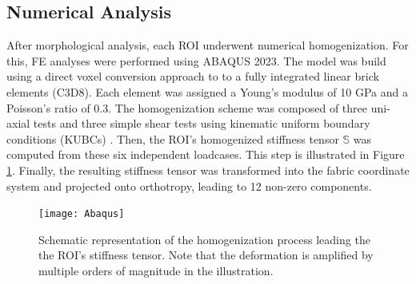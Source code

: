 \documentclass[a4paper,fleqn]{DC_ArtStyle}
\begin{document}
	\subsection{Numerical Analysis}
	After morphological analysis, each ROI underwent numerical homogenization.
	For this, \textmu FE analyses were performed using ABAQUS 2023.
	The model was build using a direct voxel conversion approach to to a fully integrated linear brick elements (C3D8).
	Each element was assigned a Young's modulus of 10 GPa and a Poisson's ratio of 0.3.
	The homogenization scheme was composed of three uni-axial tests and three simple shear tests using kinematic uniform boundary conditions (KUBCs) \cite{Panyasantisuk2015}.
	Then, the ROI's homogenized stiffness tensor $\mathbb{S}$ was computed from these six independent loadcases.
	This step is illustrated in Figure \ref{FigHomogenization}.
	Finally, the resulting stiffness tensor was transformed into the fabric coordinate system and projected onto orthotropy, leading to 12 non-zero components.

	\begin{figure}
		\texttt{[image: Abaqus]}
		\caption{Schematic representation of the homogenization process leading the the ROI's stiffness tensor.
				 Note that the deformation is amplified by multiple orders of magnitude in the illustration.}
		\label{FigHomogenization}
	\end{figure}
\end{document}
